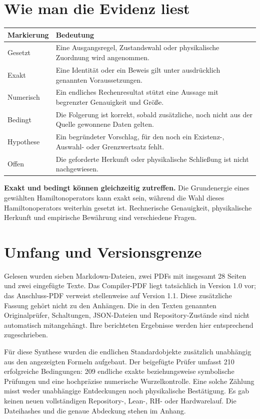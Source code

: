 \documentclass[11pt,a4paper,oneside,parskip=half,headings=normal]{scrreprt}
\begin{document}
\section*{Wie man die Evidenz liest}
\par\noindent\begin{tabularx}{\linewidth}{L{27mm}Y}
\toprule
\textbf{Markierung}&\textbf{Bedeutung}\\\midrule
Gesetzt&Eine Ausgangsregel, Zustandswahl oder physikalische Zuordnung wird angenommen.\\
Exakt&Eine Identität oder ein Beweis gilt unter ausdrücklich genannten Voraussetzungen.\\
Numerisch&Ein endliches Rechenresultat stützt eine Aussage mit begrenzter Genauigkeit und Größe.\\
Bedingt&Die Folgerung ist korrekt, sobald zusätzliche, noch nicht aus der Quelle gewonnene Daten gelten.\\
Hypothese&Ein begründeter Vorschlag, für den noch ein Existenz-, Auswahl- oder Grenzwertsatz fehlt.\\
Offen&Die geforderte Herkunft oder physikalische Schließung ist nicht nachgewiesen.\\\bottomrule
\end{tabularx}\par

\textbf{Exakt und bedingt können gleichzeitig zutreffen.} Die Grundenergie eines gewählten Hamiltonoperators kann exakt sein, während die Wahl dieses Hamiltonoperators weiterhin gesetzt ist. Rechnerische Genauigkeit, physikalische Herkunft und empirische Bewährung sind verschiedene Fragen.

\section*{Umfang und Versionsgrenze}
Gelesen wurden sieben Markdown-Dateien, zwei PDFs mit insgesamt 28 Seiten und zwei eingefügte Texte. Das Compiler-PDF liegt tatsächlich in Version 1.0 vor; das Anschluss-PDF verweist stellenweise auf Version 1.1. Diese zusätzliche Fassung gehört nicht zu den Anhängen. Die in den Texten genannten Originalprüfer, Schaltungen, JSON-Dateien und Repository-Zustände sind nicht automatisch mitangehängt. Ihre berichteten Ergebnisse werden hier entsprechend zugeschrieben.

Für diese Synthese wurden die endlichen Standardobjekte zusätzlich unabhängig aus den angezeigten Formeln aufgebaut. Der beigefügte Prüfer umfasst 210 erfolgreiche Bedingungen: 209 endliche exakte beziehungsweise symbolische Prüfungen und eine hochpräzise numerische Wurzelkontrolle. Eine solche Zählung misst weder unabhängige Entdeckungen noch physikalische Bestätigung. Es gab keinen neuen vollständigen Repository-, Lean-, RH- oder Hardwarelauf. Die Dateihashes und die genaue Abdeckung stehen im Anhang.
\end{document}

